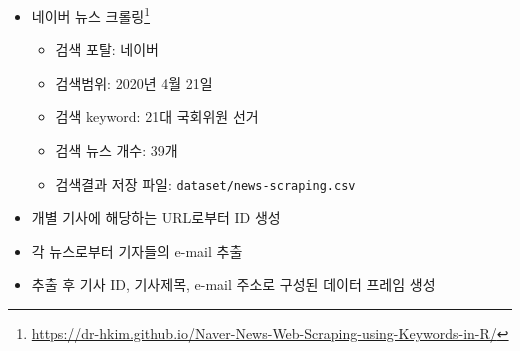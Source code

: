\documentclass[
  11pt,
]{krantz}
\providecommand{\tightlist}{%
  \setlength{\itemsep}{0pt}\setlength{\parskip}{0pt}}
\renewcommand{\href}[2]{#2\footnote{\url{#1}}}
\begin{document}
\begin{itemize}
\tightlist
\item
  \href{https://dr-hkim.github.io/Naver-News-Web-Scraping-using-Keywords-in-R/}{네이버 뉴스 크롤링} \citep{naver-scraping}

  \begin{itemize}
  \tightlist
  \item
    검색 포탈: 네이버
  \item
    검색범위: 2020년 4월 21일
  \item
    검색 keyword: 21대 국회위원 선거
  \item
    검색 뉴스 개수: 39개
  \item
    검색결과 저장 파일: \texttt{dataset/news-scraping.csv}
  \end{itemize}
\item
  개별 기사에 해당하는 URL로부터 ID 생성
\item
  각 뉴스로부터 기자들의 e-mail 추출
\item
  추출 후 기사 ID, 기사제목, e-mail 주소로 구성된 데이터 프레임 생성
\end{itemize}

\footnotesize
\end{document}
